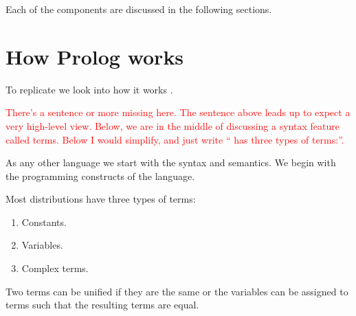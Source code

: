 \documentclass[thesis-solanki.tex]{subfiles}
\begin{document}
Each of the components are discussed in the following sections.


\section{How Prolog works}

To replicate  we look into how it works \cite{webiste:learnprolognow}.

\textcolor{red}{There's a sentence or more missing here. The sentence above leads up to expect a very
  high-level view.  Below, we are in the middle of discussing a syntax feature called terms.
  Below I would simplify, and just write `` has three types of terms:''.
}

As any other language
we start with the syntax and semantics. We begin with the programming constructs of the language.

Most  distributions have three types of terms:
\begin{enumerate}
\item Constants.

\item Variables.

\item Complex terms.
\end{enumerate}

Two terms can be unified if they are the same or the variables can be assigned to terms such that the resulting
terms are equal.
\end{document}
